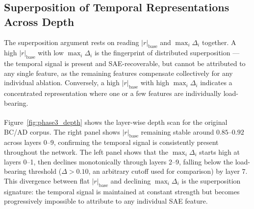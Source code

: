 \documentclass[11pt]{article}
\begin{document}
\subsection{Superposition of Temporal Representations Across Depth}
\label{sec:superposition}

The superposition argument rests on reading $|r|_{\text{base}}$ and $\max_i \Delta_i$ together. A high $|r|_{\text{base}}$ with low 
$\max_i \Delta_i$ is the fingerprint of distributed superposition --- the temporal signal is present and SAE-recoverable, but cannot be attributed 
to any single feature, as the remaining features compensate collectively for any individual ablation. Conversely, a high $|r|_{\text{base}}$ with 
high $\max_i \Delta_i$ indicates a concentrated representation where one or a few features are individually load-bearing.
\\
\\
Figure~\ref{fig:phase3_depth} shows the layer-wise depth scan for the original BC/AD corpus. The right panel shows $|r|_{\text{base}}$ remaining 
stable around $0.85$--$0.92$ across layers 0--9, confirming the temporal signal is consistently present throughout the network. The left panel 
shows that the $\max_i \Delta_i$ starts high at layers 0--1, then 
declines monotonically through layers 2--9, falling below the load-bearing threshold ($\Delta > 0.10$, an arbitrary cutoff used for comparison) by layer 7. This divergence between flat $|r|_{\text{base}}$ and 
declining $\max_i \Delta_i$ is the superposition signature: the temporal signal is maintained at constant strength but becomes progressively 
impossible to attribute to any individual SAE feature.
\end{document}
